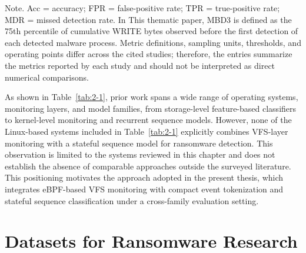 Note. Acc = accuracy; FPR = false-positive rate; TPR = true-positive rate; MDR = missed detection rate. In This thematic paper, MBD3 is defined as the 75th percentile of cumulative WRITE bytes observed before the first detection of each detected malware process. Metric definitions, sampling units, thresholds, and operating points differ across the cited studies; therefore, the entries summarize the metrics reported by each study and should not be interpreted as direct numerical comparisons.

As shown in Table~\ref{tab:2-1}, prior work spans a wide range of operating systems, monitoring layers, and model families, from storage-level feature-based classifiers to kernel-level monitoring and recurrent sequence models. However, none of the Linux-based systems included in Table~\ref{tab:2-1} explicitly combines VFS-layer monitoring with a stateful sequence model for ransomware detection. This observation is limited to the systems reviewed in this chapter and does not establish the absence of comparable approaches outside the surveyed literature. This positioning motivates the approach adopted in the present thesis, which integrates eBPF-based VFS monitoring with compact event tokenization and stateful sequence classification under a cross-family evaluation setting.

\section{Datasets for Ransomware Research}\label{sec:2.4}

